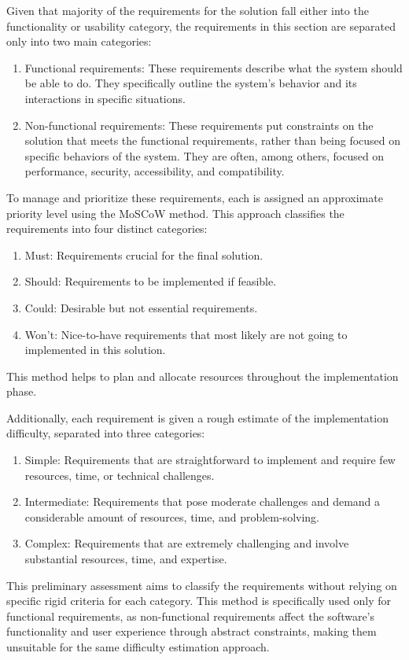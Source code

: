 Given that majority of the requirements for the solution fall either into the functionality or usability category, the requirements in this section are separated only into two main categories: \cite{Aurum2005}
\begin{enumerate}
    \item Functional requirements: These requirements describe what the system should be able to do. They specifically outline the system's behavior and its interactions in specific situations.
    \item Non-functional requirements: These requirements put constraints on the solution that meets the functional requirements, rather than being focused on specific behaviors of the system. They are often, among others, focused on performance, security, accessibility, and compatibility.
\end{enumerate}

To manage and prioritize these requirements, each is assigned an approximate priority level using the MoSCoW method. This approach classifies the requirements into four distinct categories: \cite{Stephens2023}
\begin{enumerate}
    \item Must: Requirements crucial for the final solution.
    \item Should: Requirements to be implemented if feasible.
    \item Could: Desirable but not essential requirements.
    \item Won't: Nice-to-have requirements that most likely are not going to implemented in this solution.
\end{enumerate}
This method helps to plan and allocate resources throughout the implementation phase.

Additionally, each requirement is given a rough estimate of the implementation difficulty, separated into three categories:
\begin{enumerate}
    \item Simple: Requirements that are straightforward to implement and require few resources, time, or technical challenges.
    \item Intermediate: Requirements that pose moderate challenges and demand a considerable amount of resources, time, and problem-solving.
    \item Complex: Requirements that are extremely challenging and involve substantial resources, time, and expertise.
\end{enumerate}
This preliminary assessment aims to classify the requirements without relying on specific rigid criteria for each category. This method is specifically used only for functional requirements, as non-functional requirements affect the software's functionality and user experience through abstract constraints, making them unsuitable for the same difficulty estimation approach.
